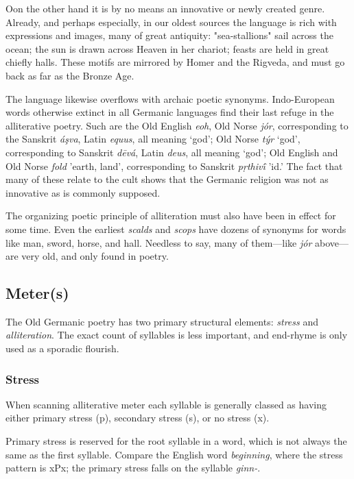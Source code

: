   Oon the other hand it is by no means an innovative or newly created genre. Already, and perhaps especially, in our oldest sources the language is rich with expressions and images, many of great antiquity: "sea-stallions" sail across the ocean; the sun is drawn across Heaven in her chariot; feasts are held in great chiefly halls. These motifs are mirrored by Homer and the Rigveda, and must go back as far as the Bronze Age.

  The language likewise overflows with archaic poetic synonyms.  Indo-European words otherwise extinct in all Germanic languages find their last refuge in the alliterative poetry.  Such are the Old English \emph{eoh}, Old Norse \emph{jór}, corresponding to the Sanskrit \emph{áşva}, Latin \emph{equus}, all meaning ‘god’; Old Norse \emph{týr} ‘god’, corresponding to Sanskrit \emph{dēvá}, Latin \emph{deus}, all meaning ‘god’; Old English and Old Norse \emph{fold} 'earth, land', corresponding to Sanskrit \emph{pṛthivī́} 'id.'  The fact that many of these relate to the cult shows that the Germanic religion was not as innovative as is commonly supposed.

  The organizing poetic principle of alliteration must also have been in effect for some time. Even the earliest \emph{scalds} and \emph{scops} have dozens of synonyms for words like man, sword, horse, and hall. Needless to say, many of them—like \emph{jór} above—are very old, and only found in poetry.

  \subsection{Meter(s)}
    The Old Germanic poetry has two primary structural elements: \emph{stress} and \emph{alliteration}.  The exact count of syllables is less important, and end-rhyme is only used as a sporadic flourish.

    \subsubsection{Stress}
    When scanning alliterative meter each syllable is generally classed as having either primary stress (p), secondary stress (s), or no stress (x).

    Primary stress is reserved for the root syllable in a word, which is not always the same as the first syllable.  Compare the English word \emph{beginning}, where the stress pattern is xPx; the primary stress falls on the syllable \emph{ginn-}.

